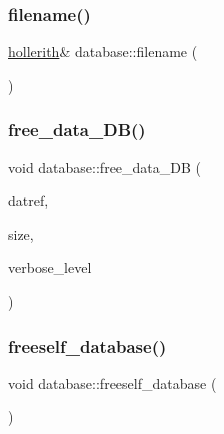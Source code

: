 \mbox{\label{classdatabase_a0d239d767658aca51abbea00148b8b2f}} 
\subsubsection{\texorpdfstring{filename()}{filename()}}
{\footnotesize\ttfamily \mbox{\hyperlink{classhollerith}{hollerith}}\& database\+::filename (\begin{DoxyParamCaption}{ }\end{DoxyParamCaption})\hspace{0.3cm}{\ttfamily [inline]}}

\mbox{\label{classdatabase_a45b6fb10b6810c9770748e7f9dda8377}} 
\subsubsection{\texorpdfstring{free\+\_\+data\+\_\+\+D\+B()}{free\_data\_DB()}}
{\footnotesize\ttfamily void database\+::free\+\_\+data\+\_\+\+DB (\begin{DoxyParamCaption}\item[{\mbox{\hyperlink{galois_8h_ac94af6544c710549c9fca744fd510395}{U\+I\+N\+T4}}}]{datref,  }\item[{\mbox{\hyperlink{galois_8h_a09fddde158a3a20bd2dcadb609de11dc}{I\+NT}}}]{size,  }\item[{\mbox{\hyperlink{galois_8h_a09fddde158a3a20bd2dcadb609de11dc}{I\+NT}}}]{verbose\+\_\+level }\end{DoxyParamCaption})}

\mbox{\label{classdatabase_a4dc263211f9b364e4fa733c8cf53e066}} 
\subsubsection{\texorpdfstring{freeself\+\_\+database()}{freeself\_database()}}
{\footnotesize\ttfamily void database\+::freeself\+\_\+database (\begin{DoxyParamCaption}{ }\end{DoxyParamCaption})}

